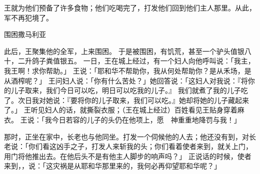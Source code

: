 {王就为他们预备了许多食物；他们吃喝完了，打发他们回到他们主人那里。从此，{}军不再犯{}境了。
\par }{\SH 围困撒马利亚
\par }{\PP {}此后，{}王{}聚集他的全军，上来围困{}。
于是{}被围困，有饥荒，甚至一个驴头值银八十{}，二升鸽子粪值银五{}。
一日，{}王在城上经过，有一个妇人向他呼叫说：「我主，我王啊！求你帮助。」
王说：「耶和华不帮助你，我从何处帮助你？是从禾场，是从酒榨呢？」
王问妇人说：「你有什么苦处？」她回答说：「这妇人对我说：『将你的儿子取来，我们今日可以吃，明日可以吃我的儿子。』
我们就煮了我的儿子吃了。次日我对她说：『要将你的儿子取来，我们可以吃。』她却将她的儿子藏起来了。」
王听见妇人的话，就撕裂衣服；（王在城上经过）百姓看见王贴身穿着麻衣。
王说：「我今日若容{}的儿子{}的头仍在他项上，愿　神重重地降罚与我！」
\par }{\PP {}那时，{}正坐在家中，长老也与他同坐。{}打发一个伺候他的人去；他还没有到，{}对长老说：「你们看这凶手之子，打发人来斩我的头；你们看着使者来到，就关上门，用门将他推出去。在他后头不是有他主人脚步的响声吗？」
正说话的时候，使者来到，{}，说：「这灾祸是从耶和华那里来的，我何必再仰望耶和华呢？」

}
